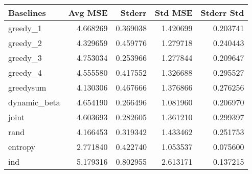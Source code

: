 \begin{tabular}{lrrrr}
\toprule
    Baselines &   Avg MSE &    Stderr &   Std MSE &  Stderr Std \\
\midrule
     greedy\_1 &  4.668269 &  0.369038 &  1.420699 &    0.203741 \\
     greedy\_2 &  4.329659 &  0.459776 &  1.279718 &    0.240443 \\
     greedy\_3 &  4.753034 &  0.253966 &  1.277844 &    0.209647 \\
     greedy\_4 &  4.555580 &  0.417552 &  1.326688 &    0.295527 \\
   greedysum &  4.130306 &  0.467666 &  1.376866 &    0.276256 \\
 dynamic\_beta &  4.654190 &  0.266496 &  1.081960 &    0.206970 \\
        joint &  4.603693 &  0.282605 &  1.361210 &    0.299397 \\
         rand &  4.166453 &  0.319342 &  1.433462 &    0.251753 \\
      entropy &  2.771840 &  0.422740 &  1.053537 &    0.075600 \\
 ind &  5.179316 &  0.802955 &  2.613171 &    0.137215 \\
 \bottomrule
\end{tabular}
